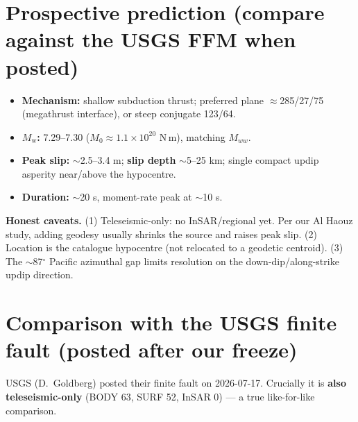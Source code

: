 \documentclass[11pt]{article}
\newcommand{\Mw}{$M_{\mathrm w}$}
\begin{document}
\section{Prospective prediction (compare against the USGS FFM when posted)}
\begin{itemize}
\item \textbf{Mechanism:} shallow subduction thrust; preferred plane $\approx$285/27/75 (megathrust
interface), or steep conjugate 123/64.
\item \textbf{\Mw:} 7.29--7.30 ($M_0 \approx 1.1\times10^{20}$ N\,m), matching $M_{ww}$.
\item \textbf{Peak slip:} $\sim$2.5--3.4 m; \textbf{slip depth} $\sim$5--25 km; single compact updip
asperity near/above the hypocentre.
\item \textbf{Duration:} $\sim$20 s, moment-rate peak at $\sim$10 s.
\end{itemize}

\textbf{Honest caveats.} (1) Teleseismic-only: no InSAR/regional yet. Per our Al Haouz study, adding
geodesy usually shrinks the source and raises peak slip. (2) Location is the catalogue hypocentre
(not relocated to a geodetic centroid). (3) The $\sim$87$^\circ$ Pacific azimuthal gap limits
resolution on the down-dip/along-strike updip direction.

\section{Comparison with the USGS finite fault (posted after our freeze)}
USGS (D.~Goldberg) posted their finite fault on 2026-07-17. Crucially it is \textbf{also
teleseismic-only} (BODY 63, SURF 52, InSAR 0) --- a true like-for-like comparison.
\end{document}
